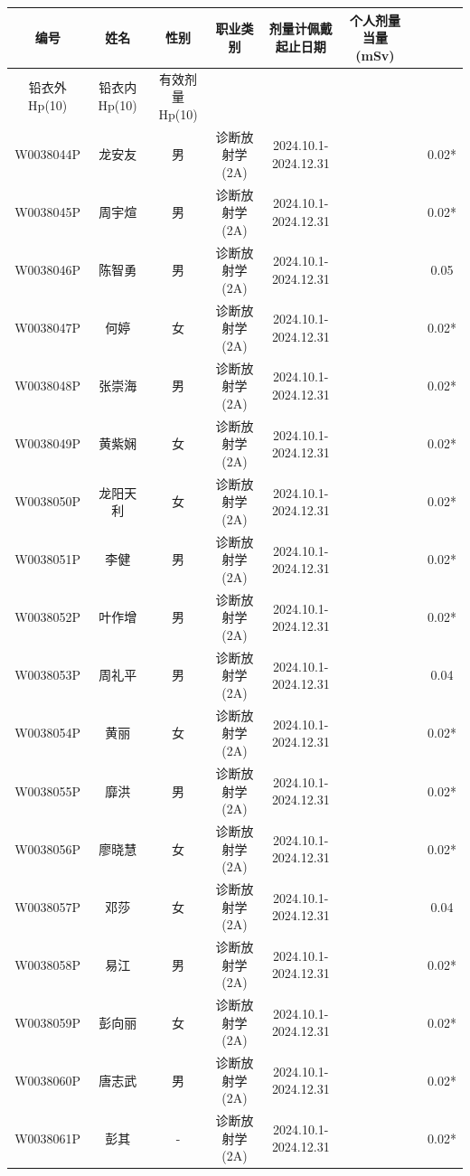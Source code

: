 \begin{table}[H]
\centering
\begin{tabular}{|c|c|c|c|c|c|c|c|}
\hline
编号 & 姓名 & 性别 & 职业类别 & 剂量计佩戴起止日期 & 个人剂量当量(mSv) &  &  \\
\hline
铅衣外Hp(10) & 铅衣内Hp(10) & 有效剂量Hp(10) &  &  &  &  &  \\
\hline
W0038044P & 龙安友 & 男 & 诊断放射学(2A) & 2024.10.1-2024.12.31 &  &  & 0.02* \\
\hline
W0038045P & 周宇煊 & 男 & 诊断放射学(2A) & 2024.10.1-2024.12.31 &  &  & 0.02* \\
\hline
W0038046P & 陈智勇 & 男 & 诊断放射学(2A) & 2024.10.1-2024.12.31 &  &  & 0.05 \\
\hline
W0038047P & 何婷 & 女 & 诊断放射学(2A) & 2024.10.1-2024.12.31 &  &  & 0.02* \\
\hline
W0038048P & 张崇海 & 男 & 诊断放射学(2A) & 2024.10.1-2024.12.31 &  &  & 0.02* \\
\hline
W0038049P & 黄紫娴 & 女 & 诊断放射学(2A) & 2024.10.1-2024.12.31 &  &  & 0.02* \\
\hline
W0038050P & 龙阳天利 & 女 & 诊断放射学(2A) & 2024.10.1-2024.12.31 &  &  & 0.02* \\
\hline
W0038051P & 李健 & 男 & 诊断放射学(2A) & 2024.10.1-2024.12.31 &  &  & 0.02* \\
\hline
W0038052P & 叶作增 & 男 & 诊断放射学(2A) & 2024.10.1-2024.12.31 &  &  & 0.02* \\
\hline
W0038053P & 周礼平 & 男 & 诊断放射学(2A) & 2024.10.1-2024.12.31 &  &  & 0.04 \\
\hline
W0038054P & 黄丽 & 女 & 诊断放射学(2A) & 2024.10.1-2024.12.31 &  &  & 0.02* \\
\hline
W0038055P & 靡洪 & 男 & 诊断放射学(2A) & 2024.10.1-2024.12.31 &  &  & 0.02* \\
\hline
W0038056P & 廖晓慧 & 女 & 诊断放射学(2A) & 2024.10.1-2024.12.31 &  &  & 0.02* \\
\hline
W0038057P & 邓莎 & 女 & 诊断放射学(2A) & 2024.10.1-2024.12.31 &  &  & 0.04 \\
\hline
W0038058P & 易江 & 男 & 诊断放射学(2A) & 2024.10.1-2024.12.31 &  &  & 0.02* \\
\hline
W0038059P & 彭向丽 & 女 & 诊断放射学(2A) & 2024.10.1-2024.12.31 &  &  & 0.02* \\
\hline
W0038060P & 唐志武 & 男 & 诊断放射学(2A) & 2024.10.1-2024.12.31 &  &  & 0.02* \\
\hline
W0038061P & 彭其 & - & 诊断放射学(2A) & 2024.10.1-2024.12.31 &  &  & 0.02* \\

\end{tabular}
\end{table}
